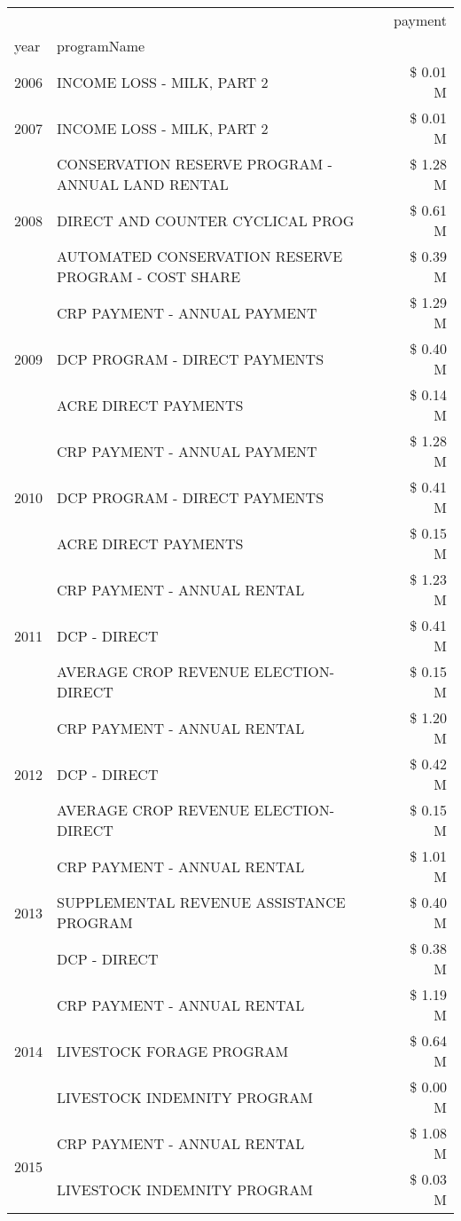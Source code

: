 \begin{tabular}{llr}
\toprule
 &  & payment \\
year & programName &  \\
\midrule
2006 & INCOME LOSS - MILK, PART 2 & \$ 0.01 M \\
\cline{1-3}
2007 & INCOME LOSS - MILK, PART 2 & \$ 0.01 M \\
\cline{1-3}
\multirow[t]{3}{*}{2008} & CONSERVATION RESERVE PROGRAM - ANNUAL LAND RENTAL & \$ 1.28 M \\
 & DIRECT AND COUNTER CYCLICAL PROG & \$ 0.61 M \\
 & AUTOMATED CONSERVATION RESERVE PROGRAM - COST SHARE & \$ 0.39 M \\
\cline{1-3}
\multirow[t]{3}{*}{2009} & CRP PAYMENT - ANNUAL PAYMENT & \$ 1.29 M \\
 & DCP PROGRAM - DIRECT PAYMENTS & \$ 0.40 M \\
 & ACRE DIRECT PAYMENTS & \$ 0.14 M \\
\cline{1-3}
\multirow[t]{3}{*}{2010} & CRP PAYMENT - ANNUAL PAYMENT & \$ 1.28 M \\
 & DCP PROGRAM - DIRECT PAYMENTS & \$ 0.41 M \\
 & ACRE DIRECT PAYMENTS & \$ 0.15 M \\
\cline{1-3}
\multirow[t]{3}{*}{2011} & CRP PAYMENT - ANNUAL RENTAL & \$ 1.23 M \\
 & DCP - DIRECT & \$ 0.41 M \\
 & AVERAGE CROP REVENUE ELECTION-DIRECT & \$ 0.15 M \\
\cline{1-3}
\multirow[t]{3}{*}{2012} & CRP PAYMENT - ANNUAL RENTAL & \$ 1.20 M \\
 & DCP - DIRECT & \$ 0.42 M \\
 & AVERAGE CROP REVENUE ELECTION-DIRECT & \$ 0.15 M \\
\cline{1-3}
\multirow[t]{3}{*}{2013} & CRP PAYMENT - ANNUAL RENTAL & \$ 1.01 M \\
 & SUPPLEMENTAL REVENUE ASSISTANCE PROGRAM & \$ 0.40 M \\
 & DCP - DIRECT & \$ 0.38 M \\
\cline{1-3}
\multirow[t]{3}{*}{2014} & CRP PAYMENT - ANNUAL RENTAL & \$ 1.19 M \\
 & LIVESTOCK FORAGE PROGRAM & \$ 0.64 M \\
 & LIVESTOCK INDEMNITY PROGRAM & \$ 0.00 M \\
\cline{1-3}
\multirow[t]{3}{*}{2015} & CRP PAYMENT - ANNUAL RENTAL & \$ 1.08 M \\
 & LIVESTOCK INDEMNITY PROGRAM & \$ 0.03 M \\

\end{tabular}
